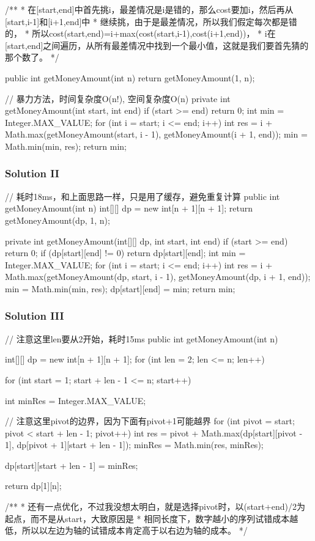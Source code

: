 \begin{Code}
/**
 * 在[start,end]中首先挑i，最差情况是i是错的，那么cost要加i，然后再从[start,i-1]和[i+1,end]中
 * 继续挑，由于是最差情况，所以我们假定每次都是错的，
 * 所以cost(start,end)=i+max(cost(start,i-1),cost(i+1,end))，
 * i在[start,end]之间遍历，从所有最差情况中找到一个最小值，这就是我们要首先猜的那个数了。
 */

public int getMoneyAmount(int n) {
    return getMoneyAmount(1, n);
}

// 暴力方法，时间复杂度O(n!), 空间复杂度O(n)
private int getMoneyAmount(int start, int end) {
    if (start >= end) {
        return 0;
    }
    int min = Integer.MAX_VALUE;
    for (int i = start; i <= end; i++) {
        int res = i + Math.max(getMoneyAmount(start, i - 1), getMoneyAmount(i + 1, end));
        min = Math.min(min, res);
    }
    return min;
}
\end{Code}

\newpage

\subsubsection{Solution II}
\begin{Code}
// 耗时18ms，和上面思路一样，只是用了缓存，避免重复计算
public int getMoneyAmount(int n) {
    int[][] dp = new int[n + 1][n + 1];
    return getMoneyAmount(dp, 1, n);
}

private int getMoneyAmount(int[][] dp, int start, int end) {
    if (start >= end) {
        return 0;
    }
    if (dp[start][end] != 0) {
        return dp[start][end];
    }
    int min = Integer.MAX_VALUE;
    for (int i = start; i <= end; i++) {
        int res = i + Math.max(getMoneyAmount(dp, start, i - 1), getMoneyAmount(dp, i + 1, end));
        min = Math.min(min, res);
    }
    dp[start][end] = min;
    return min;
}
\end{Code}

\subsubsection{Solution III}
\begin{Code}
// 注意这里len要从2开始，耗时15ms
public int getMoneyAmount(int n) {
    int[][] dp = new int[n + 1][n + 1];
    for (int len = 2; len <= n; len++) {

        for (int start = 1; start + len - 1 <= n; start++) {
            int minRes = Integer.MAX_VALUE;

            // 注意这里pivot的边界，因为下面有pivot+1可能越界
            for (int pivot = start; pivot < start + len - 1; pivot++) {
                int res = pivot + Math.max(dp[start][pivot - 1], dp[pivot + 1][start + len - 1]);
                minRes = Math.min(res, minRes);
            }

            dp[start][start + len - 1] = minRes;
        }
    }
    return dp[1][n];
}

/**
 * 还有一点优化，不过我没想太明白，就是选择pivot时，以(start+end)/2为起点，而不是从start，大致原因是
 * 相同长度下，数字越小的序列试错成本越低，所以以左边为轴的试错成本肯定高于以右边为轴的成本。
 */
\end{Code}

